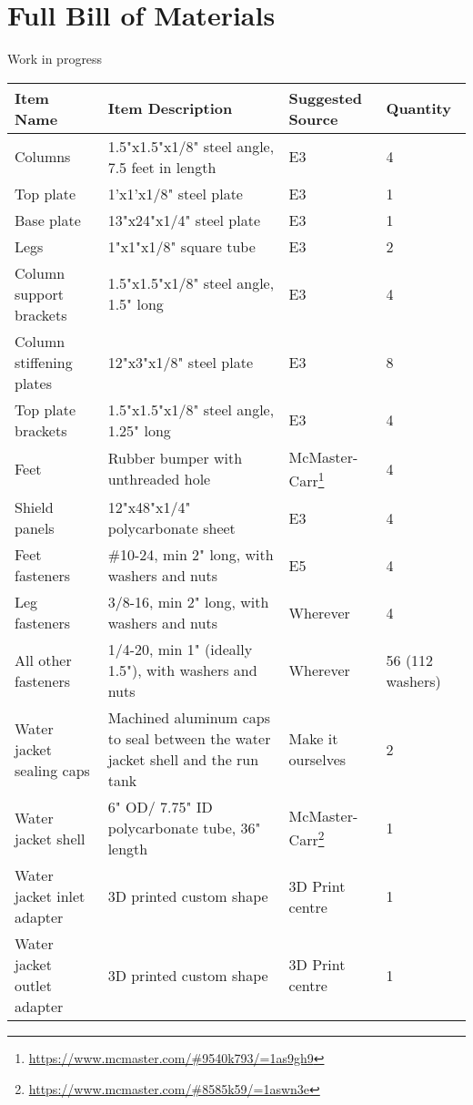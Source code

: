 \documentclass[11pt]{article}
\begin{document}
\section{Full Bill of Materials}
Work in progress
\begin{center}
	\begin{longtabu} to \linewidth { |X[l]|X[2,l]|X[l]|X[0.7,r]| }
		\hline
		\textbf{Item Name} & \textbf{Item Description} & \textbf{Suggested Source} & \textbf{Quantity} \\
		\hline
		Columns & 1.5"x1.5"x1/8" steel angle, 7.5 feet in length & E3 & 4 \\
		\hline
		Top plate & 1'x1'x1/8" steel plate & E3 & 1 \\
		\hline
		Base plate & 13"x24"x1/4" steel plate & E3 & 1 \\
		\hline
		Legs & 1"x1"x1/8" square tube & E3 & 2 \\
		\hline
		Column support brackets & 1.5"x1.5"x1/8" steel angle, 1.5" long & E3 & 4 \\
		\hline
		Column stiffening plates & 12"x3"x1/8" steel plate & E3 & 8 \\
		\hline
		Top plate brackets & 1.5"x1.5"x1/8" steel angle, 1.25" long & E3 & 4 \\
		\hline
		Feet & Rubber bumper with unthreaded hole & McMaster-Carr\footnote{\url{https://www.mcmaster.com/\#9540k793/=1as9gh9}} & 4 \\
		\hline
		Shield panels & 12"x48"x1/4" polycarbonate sheet & E3 & 4\\
		\hline
		Feet fasteners & \#10-24, min 2" long, with washers and nuts	 & E5 & 4 \\
		\hline
		Leg fasteners & 3/8-16, min 2" long, with washers and nuts & Wherever & 4 \\
		\hline
		All other fasteners & 1/4-20, min 1" (ideally 1.5"), with washers and nuts & Wherever & 56 (112 washers) \\
		\hline
		Water jacket sealing caps & Machined aluminum caps to seal between the water jacket shell and the run tank & Make it ourselves & 2 \\
		\hline
		Water jacket shell & 6" OD/ 7.75" ID polycarbonate tube, 36" length & McMaster-Carr\footnote{\url{https://www.mcmaster.com/\#8585k59/=1aswn3e}} & 1 \\
		\hline
		Water jacket inlet adapter & 3D printed custom shape & 3D Print centre & 1 \\
		\hline
		Water jacket outlet adapter & 3D printed custom shape & 3D Print centre & 1 \\

\end{longtabu}
\end{center}
\end{document}
